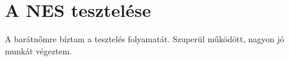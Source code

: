 \chapter{A NES tesztelése}
 A barátnőmre bíztam a tesztelés folyamatát. Szuperül működött, nagyon jó munkát végeztem.